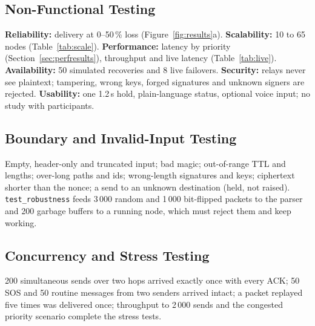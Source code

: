 \subsection{Non-Functional Testing}
\label{sec:nonfunc}
\textbf{Reliability:} delivery at 0--50\,\% loss (Figure~\ref{fig:results}a). \textbf{Scalability:} 10 to 65 nodes (Table~\ref{tab:scale}). \textbf{Performance:} latency by priority (Section~\ref{sec:perfresults}), throughput and live latency (Table~\ref{tab:live}). \textbf{Availability:} 50 simulated recoveries and 8 live failovers. \textbf{Security:} relays never see plaintext; tampering, wrong keys, forged signatures and unknown signers are rejected. \textbf{Usability:} one 1.2\,s hold, plain-language status, optional voice input; no study with participants.

\subsection{Boundary and Invalid-Input Testing}
\label{sec:boundary}
Empty, header-only and truncated input; bad magic; out-of-range TTL and lengths; over-long paths and ids; wrong-length signatures and keys; ciphertext shorter than the nonce; a send to an unknown destination (held, not raised). \texttt{test\_robustness} feeds 3\,000 random and 1\,000 bit-flipped packets to the parser and 200 garbage buffers to a running node, which must reject them and keep working.

\subsection{Concurrency and Stress Testing}
\label{sec:stress}
200 simultaneous sends over two hops arrived exactly once with every ACK; 50 SOS and 50 routine messages from two senders arrived intact; a packet replayed five times was delivered once; throughput to 2\,000 sends and the congested priority scenario complete the stress tests.

